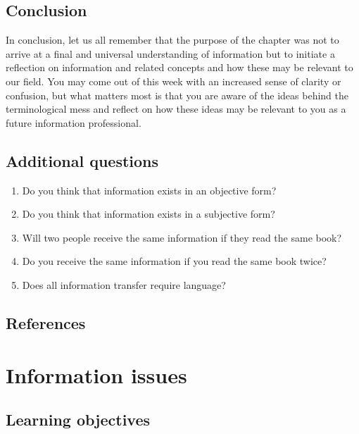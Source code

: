 \documentclass[
  letterpaper,
  DIV=11,
  numbers=noendperiod]{scrreprt}
\providecommand{\tightlist}{%
  \setlength{\itemsep}{0pt}\setlength{\parskip}{0pt}}
\begin{document}
\section{Conclusion}\label{conclusion-1}

In conclusion, let us all remember that the purpose of the chapter was
not to arrive at a final and universal understanding of information but
to initiate a reflection on information and related concepts and how
these may be relevant to our field. You may come out of this week with
an increased sense of clarity or confusion, but what matters most is
that you are aware of the ideas behind the terminological mess and
reflect on how these ideas may be relevant to you as a future
information professional.

\section{Additional questions}\label{additional-questions}

\begin{enumerate}
\def\labelenumi{\arabic{enumi}.}
\tightlist
\item
  Do you think that information exists in an objective form?
\item
  Do you think that information exists in a subjective form?
\item
  Will two people receive the same information if they read the same
  book?
\item
  Do you receive the same information if you read the same book twice?
\item
  Does all information transfer require language?
\end{enumerate}

\section{References}\label{references-1}


\chapter{Information issues}\label{information-issues}

\section{Learning objectives}\label{learning-objectives-2}
\end{document}
